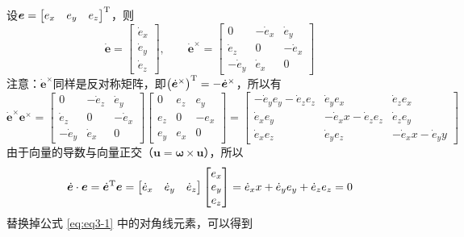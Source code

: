 \proof 设$\bm{e} = \big[ e_x \quad e_y \quad e_z \big]^{\text{T}}$，则
\begin{equation*}
	\dot{\bm{e}} =
	\begin{bmatrix}
		\dot{e}_x \\
		\dot{e}_y \\
		\dot{e}_z
	\end{bmatrix},
	\qquad 
	\dot{\bm{e}}^\times =
	\begin{bmatrix}
		0 & - \dot{e}_x & \dot{e}_y \\
		\dot{e}_z & 0 & - \dot{e}_x \\
		-\dot{e}_y & \dot{e}_x & 0
	\end{bmatrix}
\end{equation*}
注意：$\dot{\bm{e}}^\times$同样是反对称矩阵，即$\big( \dot{\bm{e}}^\times \big)^{\text{T}} = - \dot{\bm{e}}^\times$，所以有
\begin{equation}
	\dot{\bm{e}}^\times \bm{e}^\times = 
	\begin{bmatrix}
		0 & - \dot{e}_z & \dot{e}_y \\
		\dot{e}_z & 0 & - \dot{e}_x \\
		-\dot{e}_y & \dot{e}_x & 0
	\end{bmatrix}
	\begin{bmatrix}
		0 & e_z & e_y \\
		e_z & 0 & -e_x \\
		e_y & e_x & 0
	\end{bmatrix}
	=
	\begin{bmatrix}
		-\dot{e}_y e_y - \dot{e}_z e_z & \dot{e}_y e_x & \dot{e}_z e_x \\
		\dot{e}_x e_y & - \dot{e}_x x - \dot{e}_z e_z & \dot{e}_z e_y \\
		\dot{e}_x e_z & \dot{e}_y e_z & - \dot{e}_x x - \dot{e}_y y
	\end{bmatrix}
	\label{eq:eq3-1}
\end{equation}
由于向量的导数与向量正交（$\bm{u} = \bm{\omega} \times \bm{u}$），所以
\begin{equation}
	\dot{\bm{e}} \cdot \bm{e} = \dot{\bm{e}}^{\text{T}} \bm{e} = \big[ \dot{e}_x \quad \dot{e}_y \quad \dot{e}_z \big] 
	\begin{bmatrix}
		e_x \\
		e_y \\
		e_z
	\end{bmatrix}
	= \dot{e}_x x + \dot{e}_y e_y + \dot{e}_z e_z = 0
\end{equation}
替换掉公式 \eqref{eq:eq3-1} 中的对角线元素，可以得到
